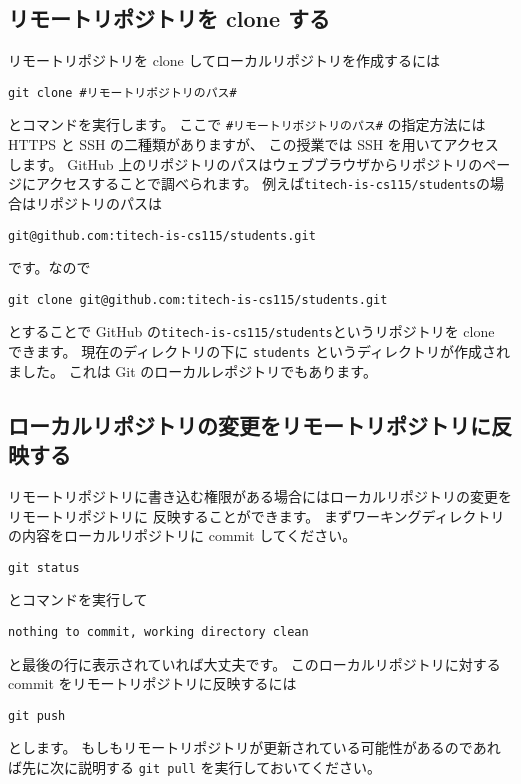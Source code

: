 \documentclass[a4paper]{article}
\begin{document}
\subsection{リモートリポジトリを clone する}
リモートリポジトリを clone してローカルリポジトリを作成するには
\begin{verbatim}
git clone #リモートリポジトリのパス#
\end{verbatim}
とコマンドを実行します。
ここで \verb|#リモートリポジトリのパス#| の指定方法には HTTPS と SSH の二種類がありますが、
この授業では SSH を用いてアクセスします。
GitHub 上のリポジトリのパスはウェブブラウザからリポジトリのページにアクセスすることで調べられます。
例えば\texttt{titech-is-cs115/students}の場合はリポジトリのパスは
\begin{verbatim}
git@github.com:titech-is-cs115/students.git
\end{verbatim}
です。なので
\begin{verbatim}
git clone git@github.com:titech-is-cs115/students.git
\end{verbatim}
とすることで GitHub の\texttt{titech-is-cs115/students}というリポジトリを clone できます。
現在のディレクトリの下に \texttt{students} というディレクトリが作成されました。
これは Git のローカルレポジトリでもあります。

\subsection{ローカルリポジトリの変更をリモートリポジトリに反映する}
リモートリポジトリに書き込む権限がある場合にはローカルリポジトリの変更をリモートリポジトリに
反映することができます。
まずワーキングディレクトリの内容をローカルリポジトリに commit してください。
\begin{verbatim}
git status
\end{verbatim}
とコマンドを実行して
\begin{verbatim}
nothing to commit, working directory clean
\end{verbatim}
と最後の行に表示されていれば大丈夫です。
このローカルリポジトリに対する commit をリモートリポジトリに反映するには
\begin{verbatim}
git push
\end{verbatim}
とします。
もしもリモートリポジトリが更新されている可能性があるのであれば先に次に説明する \texttt{git pull} を実行しておいてください。
\end{document}

